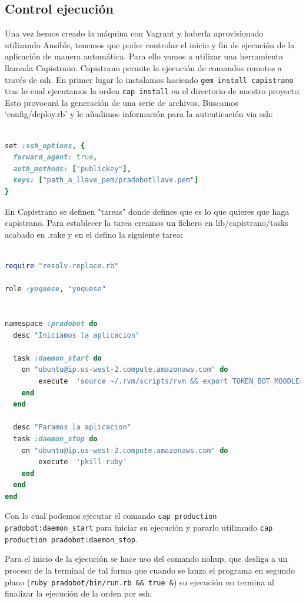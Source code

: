 \subsection{Control ejecución}

Una vez hemos creado la máquina con Vagrant y haberla aprovisionado utilizando Ansible, tenemos que poder controlar el inicio y fin de ejecución de la aplicación de manera automática. Para ello vamos a utilizar una herramienta llamada Capistrano. Capistrano permite la ejecución de comandos remotos a través de ssh. En primer lugar lo instalamos haciendo \texttt{gem install capistrano} tras lo cual ejecutamos la orden \texttt{cap install} en el directorio de nuestro proyecto. Esto provocará la generación de una serie de archivos. Buscamos \enquote*{config/deploy.rb} y le añadimos información para la autenticación via ssh:
\begin{lstlisting}[language=Ruby]

set :ssh_options, {
  forward_agent: true,
  auth_methods: ["publickey"],
  keys: ["path_a_llave_pem/pradobotllave.pem"]
}

\end{lstlisting}

En Capistrano se definen "tareas" donde defines que es lo que quieres que haga capistrano. Para establecer la tarea creamos un fichero en lib/capistrano/tasks acabado en .rake y en el defino la siguiente tarea:


\begin{lstlisting}[language=Ruby]

require "resolv-replace.rb"

role :yoquese, "yoquese"


namespace :pradobot do
  desc "Iniciamos la aplicacion"

  task :daemon_start do
	on "ubuntu@ip.us-west-2.compute.amazonaws.com" do
		execute  'source ~/.rvm/scripts/rvm && export TOKEN_BOT_MOODLE="" && export MOODLE_HOST="" && export TOKEN_BOT="" && export URL_DATABASE_TRAVIS="" && nohup ruby pradobot/bin/run.rb && true & '
	end
  end
  
  desc "Paramos la aplicacion"  
  task :daemon_stop do
	on "ubuntu@ip.us-west-2.compute.amazonaws.com" do
		execute  'pkill ruby'
	end
  end
end

\end{lstlisting}

Con lo cual podemos ejecutar el comando \texttt{cap production pradobot:daemon\_start} para iniciar su ejecución y pararlo utilizando \texttt{cap production pradobot:daemon\_stop}. \par Para el inicio de la ejecución se hace uso del comando nohup, que desliga a un proceso de la terminal de tal forma que cuando se lanza el programa en segundo plano (\texttt{ruby pradobot/bin/run.rb \&\& true \&}) su ejecución no termina al finalizar la ejecución de la orden por ssh. 

